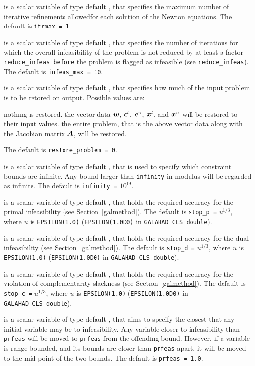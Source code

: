 \documentclass{galahad}
\newcommand{\libraryname}{GALAHAD}
\newcommand{\packagename}{CLS}
\newcommand{\fullpackagename}{\libraryname\_\packagename}
\begin{document}
\begin{description}
 is a scalar variable of type default \integer, that specifies 
the maximum number of iterative refinements allowedfor each solution of
the Newton equations.
The default is {\tt itrmax = 1}.

 is a scalar variable of type default \integer, that specifies
the number of iterations for which the overall infeasibility
of the problem is not reduced by at least a factor {\tt reduce\_infeas
before} the problem is flagged as infeasible (see {\tt reduce\_infeas}).
The default is {\tt infeas\_max = 10}.

 is a scalar variable of type default \integer, that 
specifies how much of the input problem is to be retored on output. 
Possible values are:
\begin{description}
 nothing is restored. 
 the vector data ${\bm{w}}$, 
   ${\bm{c}}^{l}$, ${\bm{c}}^{u}$, ${\bm{x}}^{l}$, and ${\bm{x}}^{u}$ 
   will be restored to their input values.
 the entire problem, that is the above vector data along with 
the Jacobian matrix ${\bm{A}}$, will be restored.
\end{description}
The default is {\tt restore\_problem = 0}.

 is a scalar variable of type default \realdp, that is used to
specify which constraint bounds are infinite.
Any bound larger than {\tt infinity} in modulus will be regarded as infinite.
The default is {\tt infinity =} $10^{19}$.

 is a scalar variable of type default \realdp, that holds the
required accuracy for the primal infeasibility (see Section~\ref{galmethod}).
The default is {\tt stop\_p =} $u^{1/3}$,
where $u$ is {\tt EPSILON(1.0)} ({\tt EPSILON(1.0D0)} in 
{\tt \fullpackagename\_double}).

 is a scalar variable of type default 
\realdp, that holds the
required accuracy for the dual infeasibility (see Section~\ref{galmethod}).
The default is {\tt stop\_d =} $u^{1/3}$,
where $u$ is {\tt EPSILON(1.0)} ({\tt EPSILON(1.0D0)} in 
{\tt \fullpackagename\_double}).

 is a scalar variable of type default 
\realdp, that holds the
required accuracy for the violation of complementarity slackness 
(see Section~\ref{galmethod}).
The default is {\tt stop\_c =} $u^{1/3}$,
where $u$ is {\tt EPSILON(1.0)} ({\tt EPSILON(1.0D0)} in 
{\tt \fullpackagename\_double}).

 is a scalar variable of type default \realdp, that aims to specify
the closest that any initial variable may be to infeasibility. Any variable
closer to infeasibility than {\tt prfeas} will be moved to {\tt prfeas} 
from the offending bound. However, if a variable is range bounded, and its 
bounds are closer than {\tt prfeas} apart, it will be moved to the 
mid-point of the two bounds.
The default is {\tt prfeas = 1.0}.


\end{description}
\end{document}
